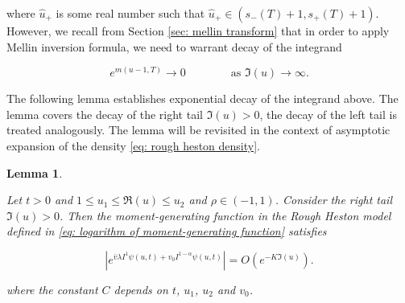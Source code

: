 \documentclass[12pt,twoside]{article}
\theoremstyle{plain}
\theoremstyle{plain}
\newtheorem{lemma}[proposition]{Lemma}
\theoremstyle{definition}
\theoremstyle{remark}
\numberwithin{equation}{section}
\begin{document}
where $\hat u_+$ is some real number such that $\hat u_+ \in\left(s_-(T) + 1, s_+(T) + 1\right)$. However, we recall from Section \ref{sec: mellin transform} that in order to apply Mellin inversion formula, we need to warrant decay of the integrand

$$e^{m(u-1, T)} \rightarrow 0 \qquad \qquad \text{as }\Im (u)\rightarrow \infty.$$

The following lemma establishes exponential decay of the integrand above. The lemma covers the decay of the right tail $\Im(u)>0$, the decay of the left tail is treated analogously. The lemma will be revisited in the context of asymptotic expansion of the density \eqref{eq: rough heston density}.

\begin{lemma}
\label{prop: exponential decay of the tails}

Let $t>0$ and $1\leq u_1 \leq \Re(u) \leq u_2$ and $\rho \in (-1, 1)$. Consider the right tail $\Im (u) > 0$. Then the moment-generating function in the Rough Heston model defined in \eqref{eq: logarithm of moment-generating function} satisfies

$$
\left|e^{\bar{v} \lambda I^{1} \psi(u, t)+v_{0} I^{1-\alpha} \psi(u, t)}\right|=O\left(e^{-K \Im(u)}\right).
$$

where the constant $C$ depends on $t$, $u_1$, $u_2$ and $v_0$.

\end{lemma}
\end{document}
